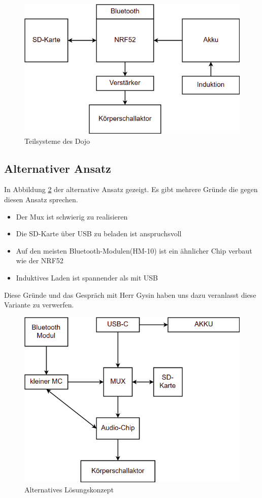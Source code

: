 \begin{figure}[H]
\begin{center}
	\includegraphics[width=120mm]{data/Loesungskonzept_Teilsysteme.png}
	\caption{Teilsysteme des Dojo} %
	\label{fig:teilsysteme}
\end{center}
\end{figure}


\subsection{Alternativer Ansatz}
In Abbildung \ref{fig:alternatives} der alternative Ansatz gezeigt. Es gibt mehrere Gründe die gegen diesen Ansatz sprechen.
\begin{itemize}
\item Der Mux ist schwierig zu realisieren
\item Die SD-Karte über USB zu beladen ist anspruchsvoll
\item Auf den meisten Bluetooth-Modulen(HM-10) ist ein ähnlicher Chip verbaut wie der NRF52
\item Induktives Laden ist spannender als mit USB
\end{itemize}
Diese Gründe und das Gespräch mit Herr Gysin haben uns dazu veranlasst diese Variante zu verwerfen.

\begin{figure}[H]
\begin{center}
	\includegraphics[width=120mm]{data/Loesungskonzept_alternativ.png}
	\caption{Alternatives Lösungskonzept} %
	\label{fig:alternatives}
\end{center}
\end{figure}


